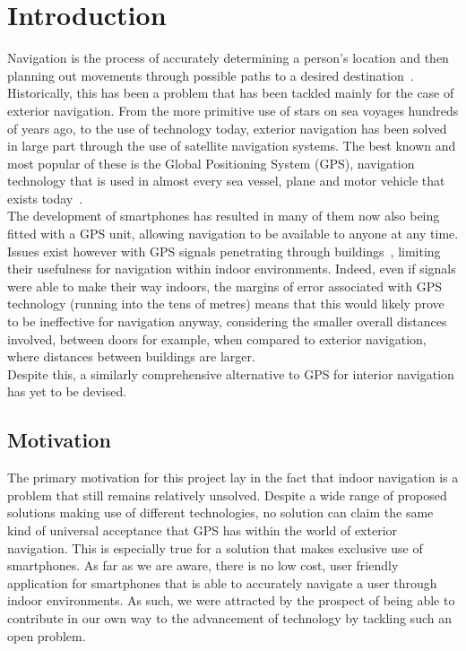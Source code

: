 \documentclass[main.tex]{subfiles}
\begin{document}
\chapter{Introduction}

Navigation is the process of accurately determining a person's location and then planning out movements through possible paths to a desired destination~\cite{navMeaning}. Historically, this has been a problem that has been tackled mainly for the case of exterior navigation. From the more primitive use of stars on sea voyages hundreds of years ago, to the use of technology today, exterior navigation has been solved in large part through the use of satellite navigation systems. The best known and most popular of these is the Global Positioning System (GPS), navigation technology that is used in almost every sea vessel, plane and motor vehicle that exists today~\cite{gps}.\\

The development of smartphones has resulted in many of them now also being fitted with a GPS unit, allowing navigation to be available to anyone at any time. Issues exist however with GPS signals penetrating through buildings~\cite{gps}, limiting their usefulness for navigation within indoor environments. Indeed, even if signals were able to make their way indoors, the margins of error associated with GPS technology (running into the tens of metres) means that this would likely prove to be ineffective for navigation anyway, considering the smaller overall distances involved, between doors for example, when compared to exterior navigation, where distances between buildings are larger.\\

Despite this, a similarly comprehensive alternative to GPS for interior navigation has yet to be devised.

\section{Motivation}

The primary motivation for this project lay in the fact that indoor navigation is a problem that still remains relatively unsolved. Despite a wide range of proposed solutions making use of different technologies, no solution can claim the same kind of universal acceptance that GPS has within the world of exterior navigation. This is especially true for a solution that makes exclusive use of smartphones. As far as we are aware, there is no low cost, user friendly application for smartphones that is able to accurately navigate a user through indoor environments. As such, we were attracted by the prospect of being able to contribute in our own way to the advancement of technology by tackling such an open problem.\\
\end{document}
